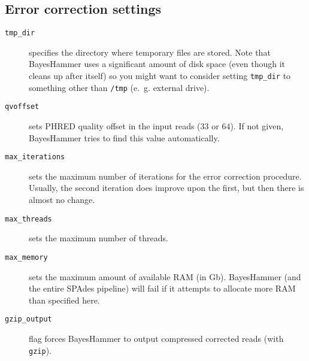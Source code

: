 \documentclass{article}
\def\spades{SPAdes}
\def\bh{BayesHammer}
\begin{document}
\subsection{Error correction settings}
\begin{description}
\item[{\tt tmp\_dir}] specifies the directory where temporary files are stored. Note that {\bh} uses a significant amount of disk space (even though it
cleans up after itself) so you might want to consider setting {\tt tmp\_dir} to something other than {\tt /tmp} (e.~g. external drive).
\item[{\tt qvoffset}] sets PHRED quality offset in the input reads ($33$ or $64$). If not given, {\bh} tries to find this value automatically.
\item[{\tt max\_iterations}] sets the maximum number of iterations
for the error correction procedure. Usually, the second iteration does improve upon the first, but then there is almost no change.
\item[{\tt max\_threads}] sets the maximum number of threads.
\item[{\tt max\_memory}] sets the maximum amount of available RAM (in Gb). {\bh} (and the entire {\spades} pipeline) will fail if it attempts
to allocate more RAM than specified here.
\item[{\tt gzip\_output}] flag forces {\bh} to output compressed corrected reads (with {\tt gzip}).
\end{description}
\end{document}
